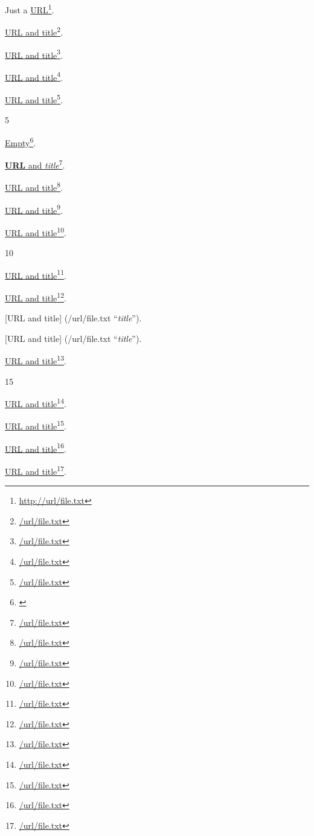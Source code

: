 
\def\mytitle{Inline Links}


Just a \href{http://url/file.txt}{URL}\footnote{\href{http://url/file.txt}{http:\slash \slash url\slash file.txt}}.

\href{/url/file.txt}{URL and title}\footnote{\href{/url/file.txt}{\slash url\slash file.txt}}.

\href{/url/file.txt}{URL and title}\footnote{\href{/url/file.txt}{\slash url\slash file.txt}}.

\href{/url/file.txt}{URL and title}\footnote{\href{/url/file.txt}{\slash url\slash file.txt}}.

\href{/url/file.txt}{URL and title}\footnote{\href{/url/file.txt}{\slash url\slash file.txt}}.

5

\href{}{Empty}\footnote{\href{}{}}.

\href{/url/file.txt}{\textbf{URL} and \emph{title}}\footnote{\href{/url/file.txt}{\slash url\slash file.txt}}.

\href{/url/file.txt}{URL and title}\footnote{\href{/url/file.txt}{\slash url\slash file.txt}}.

\href{/url/file.txt}{URL and title}\footnote{\href{/url/file.txt}{\slash url\slash file.txt}}.

\href{/url/file.txt}{URL and title}\footnote{\href{/url/file.txt}{\slash url\slash file.txt}}.

10

\href{/url/file.txt}{URL and title}\footnote{\href{/url/file.txt}{\slash url\slash file.txt}}.

\href{/url/file.txt}{URL and title}\footnote{\href{/url/file.txt}{\slash url\slash file.txt}}.

[URL and title] (\slash url\slash file.txt ``\emph{title}'').

[URL and title]
(\slash url\slash file.txt ``\emph{title}'').

\href{/url/file.txt}{URL and title}\footnote{\href{/url/file.txt}{\slash url\slash file.txt}}.

15

\href{/url/file.txt}{URL and title}\footnote{\href{/url/file.txt}{\slash url\slash file.txt}}.

\href{/url/file.txt}{URL and title}\footnote{\href{/url/file.txt}{\slash url\slash file.txt}}.

\href{/url/file.txt}{URL and title}\footnote{\href{/url/file.txt}{\slash url\slash file.txt}}.

\href{/url/file.txt}{URL and title}\footnote{\href{/url/file.txt}{\slash url\slash file.txt}}.



